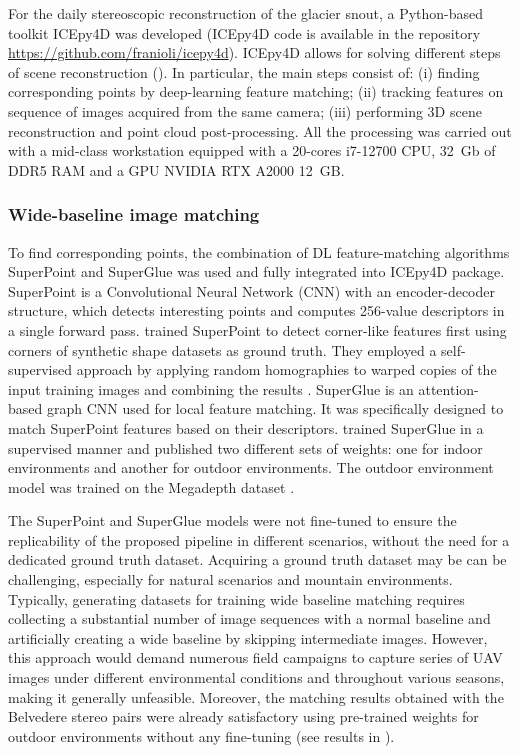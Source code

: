 For the daily stereoscopic reconstruction of the glacier snout, a Python-based toolkit
ICEpy4D was developed (ICEpy4D code is available in the repository
\url{https://github.com/franioli/icepy4d}).
ICEpy4D allows for solving different steps of scene reconstruction
(). In particular, the main steps consist of:
(i) finding corresponding points by deep-learning feature matching;
(ii) tracking features on sequence of images acquired from the same camera;
(iii) performing 3D scene reconstruction and point cloud post-processing.
All the processing was carried out with a mid-class workstation equipped with a 20-cores
i7-12700 CPU, 32~Gb of DDR5 RAM and a GPU NVIDIA RTX A2000 12~GB.

\subsubsection{Wide-baseline image matching}\label{sec:4:matching}

To find corresponding points, the combination of DL feature-matching algorithms
SuperPoint \citep{DeTone_2018} and SuperGlue \citep{sarlin2020superglue} was used and
fully integrated into ICEpy4D package.
SuperPoint is a Convolutional Neural Network (CNN) with an encoder-decoder
structure, which detects interesting points and computes 256-value descriptors in a
single forward pass.
\citet{DeTone_2018} trained SuperPoint to detect corner-like features first using corners
of synthetic shape datasets as ground truth.
They employed a self-supervised approach by applying random homographies to warped
copies of the input training images and combining the results \citep{DeTone_2018}.
SuperGlue is an attention-based graph CNN used for local feature matching.
It was specifically designed to match SuperPoint features based on their descriptors.
\citet{sarlin2020superglue} trained SuperGlue in a supervised manner and published two
different sets of weights: one for indoor environments and another for outdoor
environments.
The outdoor environment model was trained on the Megadepth dataset
\citep{Li_Snavely_2018_MegaDepth}.

The SuperPoint and SuperGlue models were not fine-tuned to ensure the replicability of
the proposed pipeline in different scenarios, without the need for a
dedicated ground truth dataset.
Acquiring a ground truth dataset may be can be challenging, especially for natural
scenarios and mountain environments.
Typically, generating datasets for training wide baseline matching requires collecting a
substantial number of image sequences with a normal baseline and artificially creating a
wide baseline by skipping intermediate images.
However, this approach would demand numerous field campaigns to capture series of UAV
images under different environmental conditions and throughout various seasons, making it
generally unfeasible.
Moreover, the matching results obtained with the Belvedere stereo pairs were already
satisfactory using pre-trained weights for outdoor environments without any fine-tuning
(see results in ).

